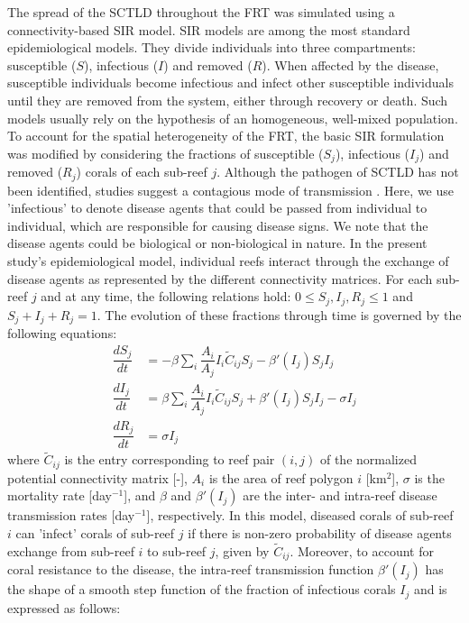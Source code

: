 The spread of the SCTLD throughout the FRT was simulated using a connectivity-based \cite{kermack1927contribution} SIR model. SIR models are among the most standard epidemiological models. They divide individuals into three compartments: susceptible ($S$), infectious ($I$) and removed ($R$). When affected by the disease, susceptible individuals become infectious and infect other susceptible individuals until they are removed from the system, either through recovery or death. Such models usually rely on the hypothesis of an homogeneous, well-mixed population. To account for the spatial heterogeneity of the FRT, the basic SIR formulation was modified by considering the fractions of susceptible ($S_j$), infectious ($I_j$) and removed ($R_j$) corals of each sub-reef $j$. Although the pathogen of SCTLD has not been identified, studies suggest a contagious mode of transmission \citep{aeby2019pathogenesis,muller2020spatial}. Here, we use 'infectious' to denote disease agents that could be passed from individual to individual, which are responsible for causing disease signs. We note that the disease agents could be biological or non-biological in nature. In the present study's epidemiological model, individual reefs interact through the exchange of disease agents as represented by the different connectivity matrices. For each sub-reef $j$ and at any time, the following relations hold: $0\leq S_j,I_j,R_j\leq 1$ and $S_j+I_j+R_j=1$. The evolution of these fractions through time is governed by the following equations:
\begin{equation}
    \begin{aligned}
        \dfrac{dS_j}{dt} &= -\beta\sum_i\dfrac{A_i}{A_j}I_i\tilde{C}_{ij}S_j - \beta'(I_j)S_jI_j \\
        \dfrac{dI_j}{dt} &= \beta\sum_i\dfrac{A_i}{A_j}I_i\tilde{C}_{ij}S_j + \beta'(I_j)S_jI_j - \sigma I_j \\
        \dfrac{dR_j}{dt} &= \sigma I_j
    \end{aligned}\label{eq:epidemio}
\end{equation}
where $\tilde{C}_{ij}$ is the entry corresponding to reef pair $(i,j)$ of the normalized potential connectivity matrix [-], $A_i$ is the area of reef polygon $i$ [km$^2$], $\sigma$ is the mortality rate [day$^{-1}$], and $\beta$ and $\beta'(I_j)$ are the inter- and intra-reef disease transmission rates [day$^{-1}$], respectively. In this model, diseased corals of sub-reef $i$ can 'infect' corals of sub-reef $j$ if there is non-zero probability of disease agents exchange from sub-reef $i$ to sub-reef $j$, given by $\tilde{C}_{ij}$. Moreover, to account for coral resistance to the disease, the intra-reef transmission function $\beta'(I_j)$ has the shape of a smooth step function of the fraction of infectious corals $I_j$ and is expressed as follows:
